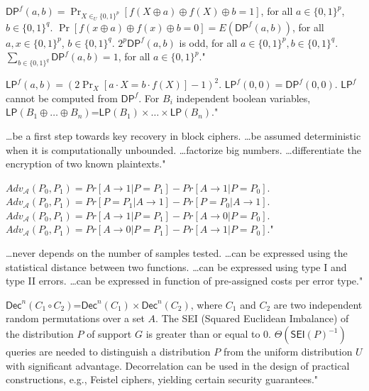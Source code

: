 {$\mathsf{DP}^f(a,b)=\displaystyle\Pr_{X\in_U\{0,1\}^p}[f(X\oplus a)\oplus f(X)\oplus b=1]$, for all $a \in \{0,1\}^p$, $b \in \{0,1\}^q$.}
{$\Pr[f(x\oplus a)\oplus f(x)\oplus b=0]=E(\mathsf{DP}^f(a,b))$, for all $a, x \in \{0,1\}^p$, $b \in \{0,1\}^q$.}
{$2^p\mathsf{DP}^f(a,b)$ is odd, for all $a \in \{0,1\}^p, b \in \{0,1\}^q$.}
{$\displaystyle\sum_{b\in\{0,1\}^q} \mathsf{DP}^f(a,b)=1$, for all $a \in \{0,1\}^p$."}

{$\mathsf{LP}^f(a, b) = (2\displaystyle\Pr_{X}[a\cdot X = b\cdot f(X)]- 1)^2$.}
{$\mathsf{LP}^f(0,0)=\mathsf{DP}^f(0,0)$.}
{$\mathsf{LP}^f$ cannot be computed from $\mathsf{DP}^f$.}
{For $B_i$ independent boolean variables, $\mathsf{LP}(B_1 \oplus \ldots \oplus B_n)$=$\mathsf{LP}(B_1) \times \ldots \times \mathsf{LP}(B_n)$."}

{\ldots be a first step towards key recovery in block ciphers.}
{\ldots be assumed deterministic when it is computationally unbounded.}
{\ldots factorize big numbers.}
{\ldots differentiate the encryption of two known plaintexts."}

{$Adv_{\mathcal{A}} (P_0 , P_1 ) = Pr[A \rightarrow 1|P = P_1 ]-Pr[A \rightarrow 1|P = P_0]$.}
{$Adv_{\mathcal{A}} (P_0 , P_1 ) = Pr[P = P_1|A \rightarrow 1]-Pr[P = P_0| A \rightarrow 1]$.}
{$Adv_{\mathcal{A}} (P_0 , P_1 ) = Pr[A \rightarrow 1|P = P_1 ]-Pr[A \rightarrow 0|P = P_0]$.}
{$Adv_{\mathcal{A}} (P_0 , P_1 ) = Pr[A \rightarrow 0|P = P_1 ]-Pr[A \rightarrow 1|P = P_0]$."}

{\ldots never depends on the number of samples tested.}
{\ldots can be expressed using the statistical distance between two functions.}
{\ldots can be expressed using type I and type II errors.}
{\ldots can be expressed in function of pre-assigned costs per error type."}

{$\mathsf{Dec}^n(C_1\circ C_2)$=$\mathsf{Dec}^n(C_1) \times \mathsf{Dec}^n(C_2)$, where $C_1$ and $C_2$ are two independent random permutations over a set $A$.}
{The SEI (Squared Euclidean Imbalance) of the distribution $P$ of support $G$ is greater than or equal to $0$.}
{$\Theta(\mathsf{SEI}(P)^{-1})$ queries are needed to distinguish a distribution $P$ from the uniform distribution $U$ with significant advantage.}
{Decorrelation can be used in the design of practical constructions, e.g., Feistel ciphers, yielding certain security guarantees."}

